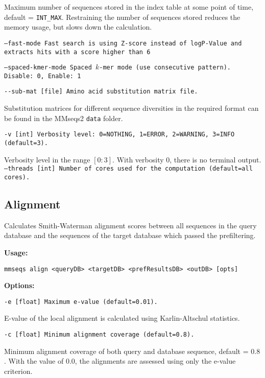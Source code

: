 \documentclass[11pt,a4paper]{scrreprt}
\begin{document}
Maximum number of sequences stored in the index table at some point of time, default = \texttt{INT\_MAX}. Restraining the number of sequences stored reduces the memory usage, but slows down the calculation.

\texttt{\small --fast-mode Fast search is using Z-score instead of logP-Value and extracts hits with a score higher than 6}{\small \par}
 
\texttt{\small --spaced-kmer-mode       Spaced $k$-mer mode (use consecutive pattern). Disable: 0, Enable: 1}{\small \par}

\texttt{\small -{}-sub-mat {[}file{]} Amino acid substitution matrix file.}{\small \par}

Substitution matrices for different sequence diversities in the required format can be found in the MMseqs2 \texttt{data} folder.

\texttt{\small -v {[}int{]} Verbosity level: 0=NOTHING, 1=ERROR, 2=WARNING, 3=INFO (default=3).}{\small \par}

Verbosity level in the range $[0:3]$. With verbosity $0$, there is no terminal output.
\texttt{\small --threads {[}int{]} Number of cores used for the computation (default=all cores).}{\small \par}
\subsection{Alignment}
Calculates Smith-Waterman alignment scores between all sequences in the query database and the sequences of the target database which passed the prefiltering.

\textbf{Usage:}

\texttt{mmseqs align <queryDB> <targetDB> <prefResultsDB> <outDB> {[}opts{]}}

\textbf{Options:}

\texttt{\small -e {[}float{]} Maximum e-value (default=0.01).}{\small \par}

E-value of the local alignment is calculated using Karlin-Altschul statistics.

\texttt{\small -c {[}float{]} Minimum alignment coverage (default=0.8).}{\small \par}

Minimum alignment coverage of both query and database sequence, default = $0.8$. With the value of $0.0$, the alignments are assessed using only the e-value criterion.
\end{document}
